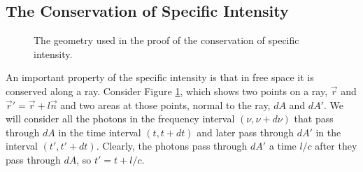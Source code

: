 \newslide

\subsection{The Conservation of Specific Intensity}

\begin{figure}
\begin{center}
\end{center}
\caption{The geometry used in the proof of the conservation of specific
  intensity.}
\label{fig-specific-intensity-conservation}
\end{figure}

An important property of the specific intensity is that in free space it
is conserved along a ray. Consider Figure
\ref{fig-specific-intensity-conservation}, which shows two points on a
ray, $\vec r$ and $\vec r' = \vec r + l\vec n$ and two areas at those
points, normal to the ray, $dA$ and $dA'$. We will consider all the
photons in the frequency interval $(\nu,\nu+d\nu)$ that pass through
$dA$ in the time interval $(t,t+dt)$ and later pass through $dA'$ in the
interval $(t',t'+dt)$. Clearly, the photons pass through $dA'$ a time
$l/c$ after they pass through $dA$, so $t'=t+l/c$.

\newslide

